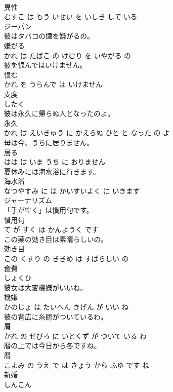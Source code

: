 \documentclass[8pt]{extreport}
\begin{document}
\begin{CJK}{UTF8}{min}
\\	異性 
\\	むすこ は もう いせい を いしき して いる			
\\	ジーパン	
\\	彼はタバコの煙を嫌がるの。	
\\	嫌がる 
\\	かれ は たばこ の けむり を いやがる の			
\\	彼を恨んではいけません。	
\\	恨む 
\\	かれ を うらんで は いけません			
\\	支度	
\\	したく		
\\	彼は永久に帰らぬ人となったのよ。	
\\	永久 
\\	かれ は えいきゅう に かえらぬ ひと と なった の よ			
\\	母は今、うちに居りません。	
\\	居る 
\\	はは は いま うち に おりません			
\\	夏休みには海水浴に行きます。	
\\	海水浴 
\\	なつやすみ に は かいすいよく に いきます			
\\	ジャーナリズム	
\\	「手が空く」は慣用句です。	
\\	慣用句 
\\	て が すく は かんようく です			
\\	この薬の効き目は素晴らしいの。	
\\	効き目 
\\	この くすり の ききめ は すばらしい の			
\\	食費	
\\	しょくひ		
\\	彼女は大変機嫌がいいね。	
\\	機嫌 
\\	かのじょ は たいへん きげん が いい ね			
\\	彼の背広に糸屑がついているわ。	
\\	屑 
\\	かれ の せびろ に いとくず が ついて いる わ			
\\	暦の上では今日から冬ですね。	
\\	暦 
\\	こよみ の うえ で は きょう から ふゆ です ね			
\\	新婚	
\\	しんこん		

\end{CJK}
\end{document}
